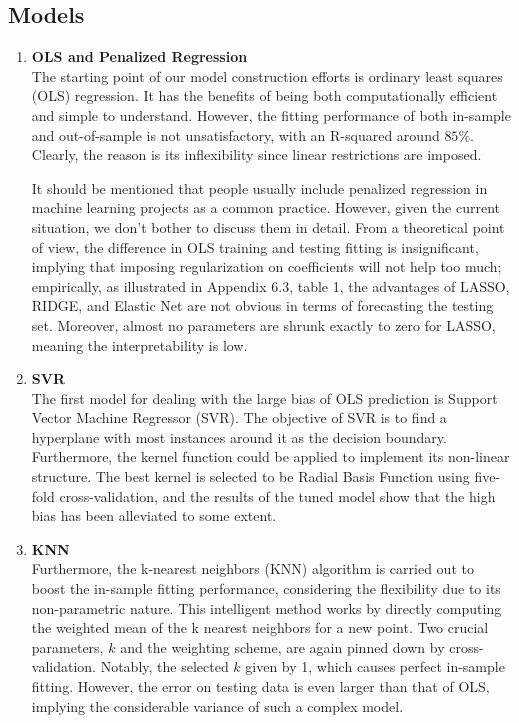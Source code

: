 \documentclass[11pt,a4paper]{article}
\begin{document}
    \subsection{Models}
    \begin{enumerate}
        \item \textbf{OLS and Penalized Regression}  \\
        The starting point of our model construction efforts is ordinary least squares (OLS) regression. It has the benefits of being both computationally efficient and simple to understand. However, the fitting performance of both in-sample and out-of-sample is not unsatisfactory, with an R-squared around $85\%$. Clearly, the reason is its inflexibility since linear restrictions are imposed.
        
        It should be mentioned that people usually include penalized regression in machine learning projects as a common practice. However, given the current situation, we don't bother to discuss them in detail. From a theoretical point of view, the difference in OLS training and testing fitting is insignificant, implying that imposing regularization on coefficients will not help too much; empirically, as illustrated in Appendix 6.3, table 1, the advantages of LASSO, RIDGE, and Elastic Net are not obvious in terms of forecasting the testing set. Moreover, almost no parameters are shrunk exactly to zero for LASSO, meaning the interpretability is low.
        \item \textbf{SVR}  \\
        The first model for dealing with the large bias of OLS prediction is Support Vector Machine Regressor (SVR). The objective of SVR is to find a hyperplane with most instances around it as the decision boundary. Furthermore, the kernel function could be applied to implement its non-linear structure. The best kernel is selected to be Radial Basis Function using five-fold cross-validation, and the results of the tuned model show that the high bias has been alleviated to some extent.
        \item \textbf{KNN}  \\
        Furthermore, the k-nearest neighbors (KNN) algorithm is carried out to boost the in-sample fitting performance, considering the flexibility due to its non-parametric nature. 
        This intelligent method works by directly computing the weighted mean of the k nearest neighbors for a new point.
        Two crucial parameters, $k$ and the weighting scheme, are again pinned down by cross-validation. Notably, the selected $k$ given by 1, which causes perfect in-sample fitting. However, the error on testing data is even larger than that of OLS, implying the considerable variance of such a complex model.

\end{enumerate}
\end{document}
